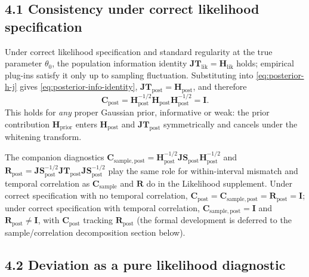 \documentclass[11pt]{article}
\begin{document}
\subsection*{4.1 Consistency under correct likelihood specification}

Under correct likelihood specification and standard regularity at the true parameter $\theta_0$, the population information identity $\mathbf{JT}_{\mathrm{lik}} = \mathbf H_{\mathrm{lik}}$ holds; empirical plug-ins satisfy it only up to sampling fluctuation. Substituting into \eqref{eq:posterior-h-j} gives \eqref{eq:posterior-info-identity}, $\mathbf{JT}_{\mathrm{post}} = \mathbf H_{\mathrm{post}}$, and therefore
\begin{equation}
\mathbf C_{\mathrm{post}}
=
\mathbf H_{\mathrm{post}}^{-1/2}
\mathbf H_{\mathrm{post}}
\mathbf H_{\mathrm{post}}^{-1/2}
=
\mathbf I.
\label{eq:posterior-c-identity}
\end{equation}
This holds for \emph{any} proper Gaussian prior, informative or weak: the prior contribution $\mathbf H_{\mathrm{prior}}$ enters $\mathbf H_{\mathrm{post}}$ and $\mathbf{JT}_{\mathrm{post}}$ symmetrically and cancels under the whitening transform.

The companion diagnostics $\mathbf C_{\mathrm{sample},\mathrm{post}} = \mathbf H_{\mathrm{post}}^{-1/2} \mathbf{JS}_{\mathrm{post}} \mathbf H_{\mathrm{post}}^{-1/2}$ and $\mathbf R_{\mathrm{post}} = \mathbf{JS}_{\mathrm{post}}^{-1/2} \mathbf{JT}_{\mathrm{post}} \mathbf{JS}_{\mathrm{post}}^{-1/2}$ play the same role for within-interval mismatch and temporal correlation as $\mathbf C_{\mathrm{sample}}$ and $\mathbf R$ do in the Likelihood supplement. Under correct specification with no temporal correlation, $\mathbf C_{\mathrm{post}} = \mathbf C_{\mathrm{sample},\mathrm{post}} = \mathbf R_{\mathrm{post}} = \mathbf I$; under correct specification with temporal correlation, $\mathbf C_{\mathrm{sample},\mathrm{post}} = \mathbf I$ and $\mathbf R_{\mathrm{post}} \neq \mathbf I$, with $\mathbf C_{\mathrm{post}}$ tracking $\mathbf R_{\mathrm{post}}$ (the formal development is deferred to the sample/correlation decomposition section below).

\subsection*{4.2 Deviation as a pure likelihood diagnostic}
\end{document}
